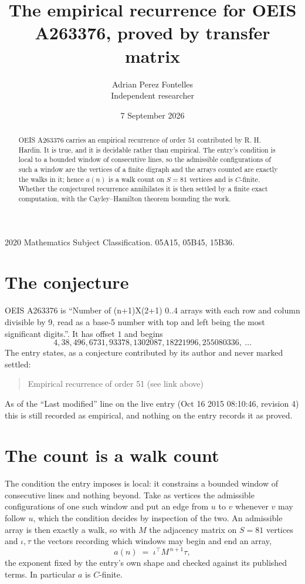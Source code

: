\documentclass[11pt,a4paper]{article}
\title{The empirical recurrence for OEIS A263376, proved by transfer matrix}
\author{Adrian Perez Fontelles\\ \small Independent researcher}
\date{7 September 2026}
\theoremstyle{plain}
\theoremstyle{definition}
\begin{document}
\maketitle

\begin{abstract}
OEIS A263376 carries an empirical recurrence of order $51$ contributed by R. H. Hardin. It is
true, and it is decidable rather than empirical. The entry's condition is local to a bounded window of consecutive lines, so
the admissible configurations of such a window are the vertices of a finite digraph and the
arrays counted are exactly the walks in it; hence $a(n)$ is a walk count on $S=81$ vertices
and is $C$-finite. Whether the conjectured recurrence annihilates it is then settled by a
finite exact computation, with the Cayley--Hamilton theorem bounding the work.
\end{abstract}

\noindent\small 2020 Mathematics Subject Classification. 05A15, 05B45, 15B36.\normalsize

\section{The conjecture}

OEIS A263376 is ``Number of (n+1)X(2+1) 0..4 arrays with each row and column divisible by 9, read as a base-5 number with top and left being the most significant digits.''. It has offset $1$ and begins
\[
4, 38, 496, 6731, 93378, 1302087, 18221996, 255080336,\ \dots
\]
The entry states, as a conjecture contributed by its author and never marked settled:
\begin{quote}
Empirical recurrence of order 51 (see link above)
\end{quote}
As of the ``Last modified'' line on the live entry (Oct 16 2015 08:10:46, revision 4) this is still
recorded as empirical, and nothing on the entry records it as proved.

\section{The count is a walk count}

The condition the entry imposes is local: it constrains a bounded window of consecutive lines and nothing beyond. Take as
vertices the admissible configurations of one such window and put an edge from $u$ to $v$
whenever $v$ may follow $u$, which the condition decides by inspection of the two. An
admissible array is then exactly a walk, so with $M$ the adjacency matrix on $S=81$ vertices
and $\iota,\tau$ the vectors recording which windows may begin and end an array,
\[
a(n)\;=\;\iota^{\!\top}M^{\,n+1}\tau ,
\]
the exponent fixed by the entry's own shape and checked against its published terms. In
particular $a$ is $C$-finite.
\end{document}
